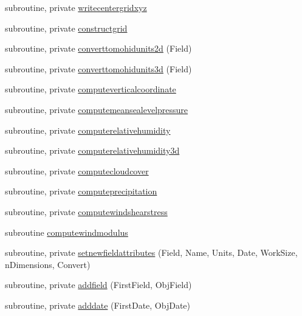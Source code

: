 \begin{DoxyCompactItemize}
\item 
subroutine, private \mbox{\hyperlink{namespacemodulemm5format_a0042a10dda1e04b0a6aeb4d67aec1d11}{writecentergridxyz}}
\item 
subroutine, private \mbox{\hyperlink{namespacemodulemm5format_aaf7b2df73bb7e6d30db2af2b3493559a}{constructgrid}}
\item 
subroutine, private \mbox{\hyperlink{namespacemodulemm5format_a971d0306a569327363e6c98d9e1dd0c7}{converttomohidunits2d}} (Field)
\item 
subroutine, private \mbox{\hyperlink{namespacemodulemm5format_a0afd52db4648ea76112e242c40b31323}{converttomohidunits3d}} (Field)
\item 
subroutine, private \mbox{\hyperlink{namespacemodulemm5format_a904f7716ce2118cfd1236ab57b46a0f3}{computeverticalcoordinate}}
\item 
subroutine, private \mbox{\hyperlink{namespacemodulemm5format_a2b31840d538f04c681c86a26a2feb21f}{computemeansealevelpressure}}
\item 
subroutine, private \mbox{\hyperlink{namespacemodulemm5format_a3dffbb656aa84f1197105f493790f428}{computerelativehumidity}}
\item 
subroutine, private \mbox{\hyperlink{namespacemodulemm5format_a6beb646cd455e39599d5f9f360390986}{computerelativehumidity3d}}
\item 
subroutine, private \mbox{\hyperlink{namespacemodulemm5format_af9b804a0c8c480ae7a682237c8d37831}{computecloudcover}}
\item 
subroutine, private \mbox{\hyperlink{namespacemodulemm5format_a86c95504025ac2f03c9c7aa475a35cc4}{computeprecipitation}}
\item 
subroutine, private \mbox{\hyperlink{namespacemodulemm5format_af869ebd4b03375bc5013329b9bce52d7}{computewindshearstress}}
\item 
subroutine \mbox{\hyperlink{namespacemodulemm5format_a9b2d602cf6fbd9095b5738722bd3a13c}{computewindmodulus}}
\item 
subroutine, private \mbox{\hyperlink{namespacemodulemm5format_afeeb0d8621c7c92d9be8dd4db8e1bf3d}{setnewfieldattributes}} (Field, Name, Units, Date, Work\+Size, n\+Dimensions, Convert)
\item 
subroutine, private \mbox{\hyperlink{namespacemodulemm5format_a136725afeaeb24f9488c92944b7b982a}{addfield}} (First\+Field, Obj\+Field)
\item 
subroutine, private \mbox{\hyperlink{namespacemodulemm5format_a6db74d155aaf7a1fd0ac77423986f988}{adddate}} (First\+Date, Obj\+Date)

\end{DoxyCompactItemize}

